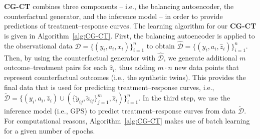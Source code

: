 \documentclass[sigconf]{acmart}
\newcommand{\framework}{\textbf{\mbox{CG-CT}}\xspace}
\begin{document}
\framework combines three components -- i.e., the balancing autoencoder, the counterfactual generator, and the inference model -- in order to provide predictions of treatment--response curves. The learning algorithm for our \framework is given in Algorithm~\ref{alg:CG-CT}. First, the balancing autoencoder is applied to the observational data $\mathcal{D} =  \{(y_i, a_i, x_i)\}_{i=1}^{n}$ to obtain $\hat{\mathcal{D}} =  \{(y_i, a_i, \hat{z}_i)\}_{i=1}^{n}$. Then, by using the counterfactual generator with $\hat{\mathcal{D}}$, we generate additional $m$ outcome--treatment pairs for each $\hat{z}_i$, thus adding $m \cdot n$ new data points that represent counterfactual outcomes (i.e., the synthetic twins). This provides the final data that is used for predicting treatment--response curves, i.e.,  $\tilde{\mathcal{D}} = \big \{(y_i, a_i, \hat{z}_i) \cup (\{ \tilde{y}_{ij}, \tilde{a}_{ij} \}_{j=1}^m , \hat{z}_i) \big \}_{i=1}^{n}$. In the third step, we use the inference model (i.e., GPS) to predict treatment--response curves from data $\tilde{\mathcal{D}}$. For computational reasons, Algorithm~\ref{alg:CG-CT} makes use of batch learning for a given number of epochs.

\end{document}
